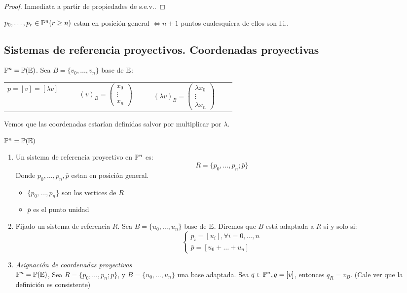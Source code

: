 \begin{proof}
    Inmediata a partir de propiedades de s.e.v..
\end{proof}
\begin{defi}
    $p_0, \dots, p_r \in \mathbb{P}^n (r \geq n)$ estan en posición general $\iff n+1$ puntos cualesquiera de ellos son l.i..
\end{defi}

\subsection{Sistemas de referencia proyectivos. Coordenadas proyectivas}

\begin{obs}
    $\mathbb{P}^n = \mathbb{P}(\mathbb{E})$. Sea $B = \{v_0, \dots, v_n\}$ base de $\mathbb{E}$:
    \begin{center} \begin{tabular}{ccc}
        $p = [v] = [\lambda v] \qquad $ &
        $(v)_B = \begin{pmatrix} x_0 \\ \vdots \\ x_n \end{pmatrix}\qquad $&
        $(\lambda v)_B = \begin{pmatrix} \lambda x_0 \\ \vdots \\ \lambda x_n \end{pmatrix} \qquad$
    \end{tabular} \end{center}
    Vemos que las coordenadas estarían definidas salvor por multiplicar por $\lambda$.
\end{obs}
\begin{defi}
    $\mathbb{P}^n = \mathbb{P}(\mathbb{E})$
    \begin{enumerate}
        \item Un sistema de referencia proyectivo en $\mathbb{P}^n$ es:
            \[ R= \{ p_0, \dots, p_n; \bar{p} \} \]
            Donde $p_0, \dots, p_n, \bar{p}$ estan en posición general.
            \begin{itemize}
                \item $\{ p_0, \dots, p_n \}$ son los vertices de $R$
                \item $\bar{p}$ es el punto unidad
            \end{itemize}
        \item Fijado un sistema de referencia $R$. Sea $B = \{ u_0, \dots, u_n \}$ base de $\mathbb{E}$. Diremos que $B$ está adaptada a $R$ si y solo si:
            \[ \begin{cases} p_i = [u_i], \forall i = 0, \dots, n \\ \bar{p} = [u_0 + \dots + u_n ] \end{cases} \]
        \item \textit{Asignación de coordenadas proyectivas} \\
            $\mathbb{P}^n = \mathbb{P}(\mathbb{E})$, Sea $R = \{ p_0, \dots, p_n; \bar{p} \}$, y $B = \{u_0, \dots, u_n\}$ una base adaptada. Sea $q \in \mathbb{P}^n, q = [v]$, entonces 
            $q_R = v_B$. (Cale ver que la definición es consistente)
    \end{enumerate}
\end{defi}
